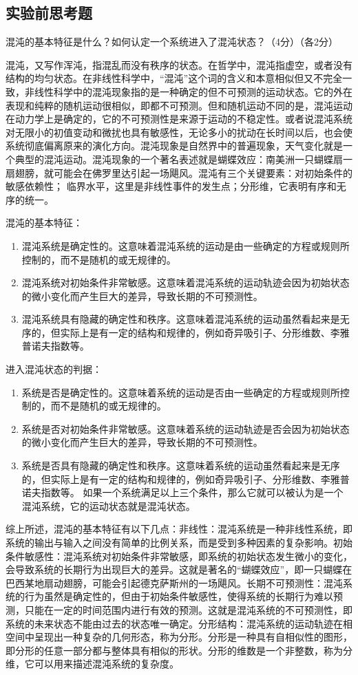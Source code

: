 \subsection{实验前思考题}
\begin{question}
	混沌的基本特征是什么？如何认定一个系统进入了混沌状态？（4分）（各2分）
\end{question}
混沌，又写作浑沌，指混乱而没有秩序的状态。在哲学中，混沌指虚空，或者没有结构的均匀状态。在非线性科学中，“混沌”这个词的含义和本意相似但又不完全一致，非线性科学中的混沌现象指的是一种确定的但不可预测的运动状态。它的外在表现和纯粹的随机运动很相似，即都不可预测。但和随机运动不同的是，混沌运动在动力学上是确定的，它的不可预测性是来源于运动的不稳定性。或者说混沌系统对无限小的初值变动和微扰也具有敏感性，无论多小的扰动在长时间以后，也会使系统彻底偏离原来的演化方向。混沌现象是自然界中的普遍现象，天气变化就是一个典型的混沌运动。混沌现象的一个著名表述就是蝴蝶效应：南美洲一只蝴蝶扇一扇翅膀，就可能会在佛罗里达引起一场飓风。混沌有三个关键要素：对初始条件的敏感依赖性；
临界水平，这里是非线性事件的发生点；分形维，它表明有序和无序的统一。

混沌的基本特征：
\begin{enumerate}
	\item 混沌系统是确定性的。这意味着混沌系统的运动是由一些确定的方程或规则所控制的，而不是随机的或无规律的。
	\item 混沌系统对初始条件非常敏感。这意味着混沌系统的运动轨迹会因为初始状态的微小变化而产生巨大的差异，导致长期的不可预测性。
	\item 混沌系统具有隐藏的确定性和秩序。这意味着混沌系统的运动虽然看起来是无序的，但实际上是有一定的结构和规律的，例如奇异吸引子、分形维数、李雅普诺夫指数等。
\end{enumerate}

进入混沌状态的判据：
\begin{enumerate}
	\item 系统是否是确定性的。这意味着系统的运动是否由一些确定的方程或规则所控制的，而不是随机的或无规律的。
	\item 系统是否对初始条件非常敏感。这意味着系统的运动轨迹是否会因为初始状态的微小变化而产生巨大的差异，导致长期的不可预测性。
	\item 系统是否具有隐藏的确定性和秩序。这意味着系统的运动虽然看起来是无序的，但实际上是有一定的结构和规律的，例如奇异吸引子、分形维数、李雅普诺夫指数等。
	如果一个系统满足以上三个条件，那么它就可以被认为是一个混沌系统，它的运动状态就是混沌状态。
\end{enumerate}

综上所述，混沌的基本特征有以下几点：非线性：混沌系统是一种非线性系统，即系统的输出与输入之间没有简单的比例关系，而是受到多种因素的复杂影响。初始条件敏感性：混沌系统对初始条件非常敏感，即系统的初始状态发生微小的变化，会导致系统的长期行为出现巨大的差异。这就是著名的“蝴蝶效应”，即一只蝴蝶在巴西某地扇动翅膀，可能会引起德克萨斯州的一场飓风。长期不可预测性：混沌系统的行为虽然是确定性的，但由于初始条件敏感性，使得系统的长期行为难以预测，只能在一定的时间范围内进行有效的预测。这就是混沌系统的不可预测性，即系统的未来状态不能由过去的状态唯一确定。分形结构：混沌系统的运动轨迹在相空间中呈现出一种复杂的几何形态，称为分形。分形是一种具有自相似性的图形，即分形的任意一部分都与整体具有相似的形状。分形的维数是一个非整数，称为分维，它可以用来描述混沌系统的复杂度。

